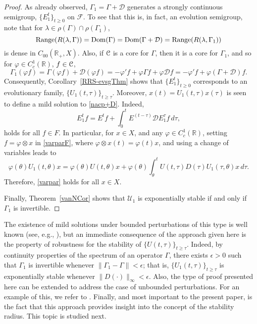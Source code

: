 \documentclass[10pt,psamsfonts,leqno]{siamltex}
\newcommand{\bbR}{\mathbb{R}}
\newcommand{\scrC}{\EuScript{C}}
\newcommand{\Dom}{\operatorname{Dom}}
\renewcommand{\t}{\tau}
\newcommand{\vphi}{\varphi}
\newcommand{\lb}{\label}
\newcommand{\Coo}{{C_{00}(\bbR_+,X)}}
\newcommand{\Uone}{\mathcal{U}_1}
\begin{document}
\begin{proof} As already observed,
$\Gamma_1=\Gamma+\mathcal{D}$ generates a strongly continuous semigroup,
$\{E_1^t\}_{t\ge0}$ on ${\mathcal F}$.  To see that this is, in fact, an
evolution semigroup, note that for
$\lambda\in\rho(\Gamma)\cap\rho(\Gamma_1)$,
\[\Range(R(\lambda,\Gamma))=\Dom(\Gamma)
=\Dom(\Gamma+\mathcal{D})
=\Range(R(\lambda,\Gamma_1))\] is dense in $\Coo$.
Also, if $\scrC$
is a core for $\Gamma$, then it is a core for $\Gamma_1$, and so
for $\vphi\in C_c^1(\bbR)$, $f\in\scrC$,
\[
\Gamma_1(\vphi f)=\Gamma(\vphi f)+\mathcal{D}(\vphi f)=
-\vphi'f+\vphi\Gamma f+\vphi \mathcal{D} f
=-\vphi'f+\vphi(\Gamma+\mathcal{D})f.
\]
Consequently, Corollary~\ref{RRS-evsgThm} shows that $\{E_1^t\}_{t\ge0}$
corresponds to an evolutionary family, $\{U_1(t,\tau)\}_{t\ge \tau}$.
Moreover,  $x(t)=U_1(t,\tau)x(\tau)$ is
seen to define a mild solution to \eqref{nacp+D}.  Indeed,
\begin{equation}\lb{varparF}
E_1^tf=E^tf+\int_0^tE^{(t-\t)}\mathcal{D} E_1^\t f \,d\t,
\end{equation}
holds for all $f\in F$.  In particular, for $x\in X$, and any
$\vphi\in C_c^1(\bbR)$, setting $f=\vphi\otimes x$ in \eqref{varparF},
where $\vphi\otimes x(t)=\vphi(t)x$,
and using a change of variables leads to
\[
\vphi(\theta)U_1(t,\theta)x=\vphi(\theta)U(t,\theta)x+
 \vphi(\theta)\int_\theta^tU(t,\t)D(\t)U_1(\t,\theta)x\,d\t.
\]
Therefore, \eqref{varpar} holds for all $x\in X$.

Finally, Theorem~\ref{vanNCor} shows that $\Uone$ is exponentially
stable if and only if $\Gamma_1$ is invertible.
\end{proof}

The existence of mild solutions under bounded perturbations of
this type is well known (see, e.g., \cite{CP}), but an immediate
consequence of the approach given here is the property of
robustness for the stability of $\{U(t,\tau)\}_{t\ge\tau}$.  Indeed, by
continuity  properties of the spectrum of an operator $\Gamma$, there
exists $\epsilon>0$ such that $\Gamma_1$ is invertible whenever
$\|\Gamma_1-\Gamma\|<\epsilon$;  that is, $\{U_1(t,\tau)\}_{t\ge\tau}$
is
exponentially stable whenever $\|D(\cdot)\|_\infty<\epsilon$.
Also, the type of proof presented here can be extended to address
the case of unbounded perturbations.  For an example of this, we refer
to \cite{RRSV}.
Finally, and most important to the present paper, is the fact that this
approach provides insight into the concept of the stability radius.
This topic is studied next.
\end{document}
